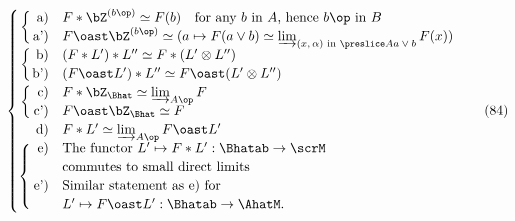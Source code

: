 \begin{equation}
  \label{eq:106.84}
  \left\{%
    \renewcommand*{\arraystretch}{1.15}%
    \begin{array}{@{}r@{}rl@{}}
      \left\{\rule{0pt}{3.2ex}\right. &
      \begin{tabular}{@{}r@{}}
        a) \\ 
        a')
      \end{tabular} &
      \begin{array}{@{}l@{}}
        \smash{F*\bZ^{(b\op)}\simeq F(b)\quad\text{for any $b$ in $A$, hence
        $b\op$ in $B$}} \\
        \smash{F\oast\bZ^{(b\op)}\simeq(a\mapsto F(a\lor b)\simeq
        \varinjlim_{\text{$(x,\alpha)$ in $\preslice A{a\lor
        b}$}} F(x))}
      \end{array} \\
      \left\{\rule{0pt}{3.2ex}\right. &
      \begin{tabular}{@{}r@{}}
        b) \\
        b')
      \end{tabular} &
      \begin{array}{@{}l@{}}
        \smash{(F*L')*L'' \simeq F*(L'\otimes L'')} \\
        \smash{(F\oast L')*L'' \simeq F\oast(L'\otimes L'')}
      \end{array} \\
      \left\{\rule{0pt}{3.2ex}\right. &
      \begin{tabular}{@{}r@{}}
        c) \\
        c')
      \end{tabular} &
      \begin{array}{@{}l@{}}
        \smash{F*\bZ_\Bhat \simeq \varinjlim_{A\op} F} \\
        \smash{F \oast \bZ_\Bhat \simeq F}
      \end{array} \\
      & \text{d)} &\smash{F*L' \simeq \varinjlim_{A\op} F\oast L'} \\
      \left\{\rule{0pt}{6.2ex}\right. &
      \begin{tabular}{@{}r@{}}
        e) \\
        $\phantom{()}$ \\
        e') \\
        $\phantom{()}$
      \end{tabular} &
      \begin{tabular}{@{}l@{}}
        The functor $\smash{L'\mapsto F*L':\Bhatab\to\scrM}$ \\
        commutes to small direct limits \\
        Similar statement as e) for \\
        $\smash{L'\mapsto F\oast L':\Bhatab\to\AhatM}$.
      \end{tabular}
    \end{array}
  \right.\tag{84}
\end{equation}
